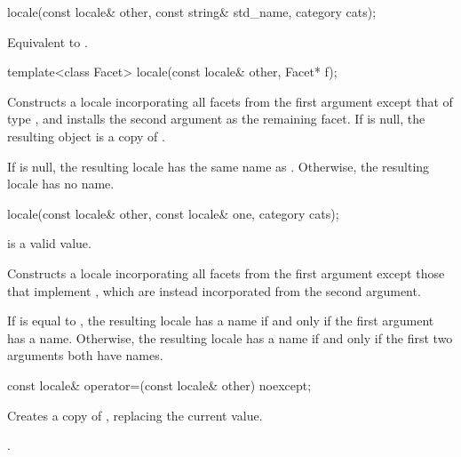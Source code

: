 %
\begin{itemdecl}
locale(const locale& other, const string& std_name, category cats);
\end{itemdecl}

\begin{itemdescr}
\pnum
\effects
Equivalent to .
\end{itemdescr}

%
\begin{itemdecl}
template<class Facet> locale(const locale& other, Facet* f);
\end{itemdecl}

\begin{itemdescr}
\pnum
\effects
Constructs a locale incorporating all facets from the first argument
except that of type ,
and installs the second argument as the remaining facet.
If  is null, the resulting object is a copy of .

\pnum
\remarks
If  is null,
the resulting locale has the same name as .
Otherwise, the resulting locale has no name.
\end{itemdescr}

%
\begin{itemdecl}
locale(const locale& other, const locale& one, category cats);
\end{itemdecl}

\begin{itemdescr}
\pnum
\expects
{} is a valid  value.

\pnum
\effects
Constructs a locale incorporating all facets from the first argument
except those that implement ,
which are instead incorporated from the second argument.

\pnum
\remarks
If  is equal to ,
the resulting locale has a name if and only if the first argument has a name.
Otherwise, the resulting locale has a name if and only if
the first two arguments both have names.
\end{itemdescr}

%
\begin{itemdecl}
const locale& operator=(const locale& other) noexcept;
\end{itemdecl}

\begin{itemdescr}
\pnum
\effects
Creates a copy of , replacing the current value.

\pnum
\returns
{}.
\end{itemdescr}


